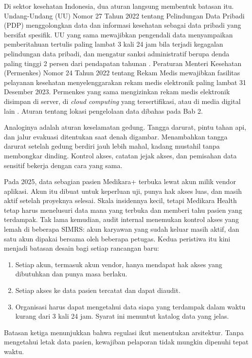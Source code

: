 Di sektor kesehatan Indonesia, dua aturan langsung membentuk batasan itu. Undang-Undang
(UU) Nomor 27 Tahun 2022 tentang Pelindungan Data Pribadi (PDP) menggolongkan data dan
informasi kesehatan sebagai data pribadi yang bersifat spesifik. UU yang sama mewajibkan
pengendali data menyampaikan pemberitahuan tertulis paling lambat 3 kali 24 jam bila
terjadi kegagalan pelindungan data pribadi, dan mengatur sanksi administratif berupa
denda paling tinggi 2 persen dari pendapatan tahunan \cite{uu27-2022-pdp}. Peraturan
Menteri Kesehatan (Permenkes) Nomor 24 Tahun 2022 tentang Rekam Medis mewajibkan
fasilitas pelayanan kesehatan menyelenggarakan rekam medis elektronik paling lambat 31
Desember 2023. Permenkes yang sama mengizinkan rekam medis elektronik disimpan di server,
di \textit{cloud computing} yang tersertifikasi, atau di media digital lain
\cite{permenkes24-2022}. Aturan tentang lokasi pengelolaan data dibahas pada Bab 2.

Analoginya adalah aturan keselamatan gedung. Tangga darurat, pintu tahan api, dan jalur
evakuasi ditentukan saat denah digambar. Menambahkan tangga darurat setelah gedung
berdiri jauh lebih mahal, kadang mustahil tanpa membongkar dinding. Kontrol akses,
catatan jejak akses, dan pemisahan data sensitif bekerja dengan cara yang sama.

\begin{kasus}[title={Kasus Medikara Health: Insiden Vendor dan Temuan Audit}]
  Pada 2025, data sebagian pasien Medikara+ terbuka lewat akun milik vendor aplikasi.
  Akun itu dibuat untuk keperluan uji, punya hak akses luas, dan masih aktif setelah
  proyeknya selesai. Skala insidennya kecil, tetapi Medikara Health tetap harus
  menelusuri data mana yang terbuka dan memberi tahu pasien yang terdampak. Tak lama
  kemudian, audit internal menemukan kontrol akses yang lemah di beberapa SIMRS:
  akun karyawan yang sudah keluar masih aktif, dan satu akun dipakai bersama oleh
  beberapa petugas. Kedua peristiwa itu kini menjadi batasan desain bagi setiap
  rancangan baru:
  \begin{enumerate}
    \item Setiap akun, termasuk akun vendor, hanya mendapat hak akses yang dibutuhkan
          dan punya masa berlaku.
    \item Setiap akses ke data pasien tercatat dan dapat diaudit.
    \item Organisasi harus dapat mengetahui data siapa yang terdampak dalam waktu kurang
          dari 3 kali 24 jam. Syarat ini menuntut katalog data yang jelas.
  \end{enumerate}
  Batasan ketiga menunjukkan bahwa regulasi ikut menentukan arsitektur. Tanpa mengetahui
  letak data pasien, kewajiban pelaporan tidak mungkin dipenuhi tepat waktu.
\end{kasus}


